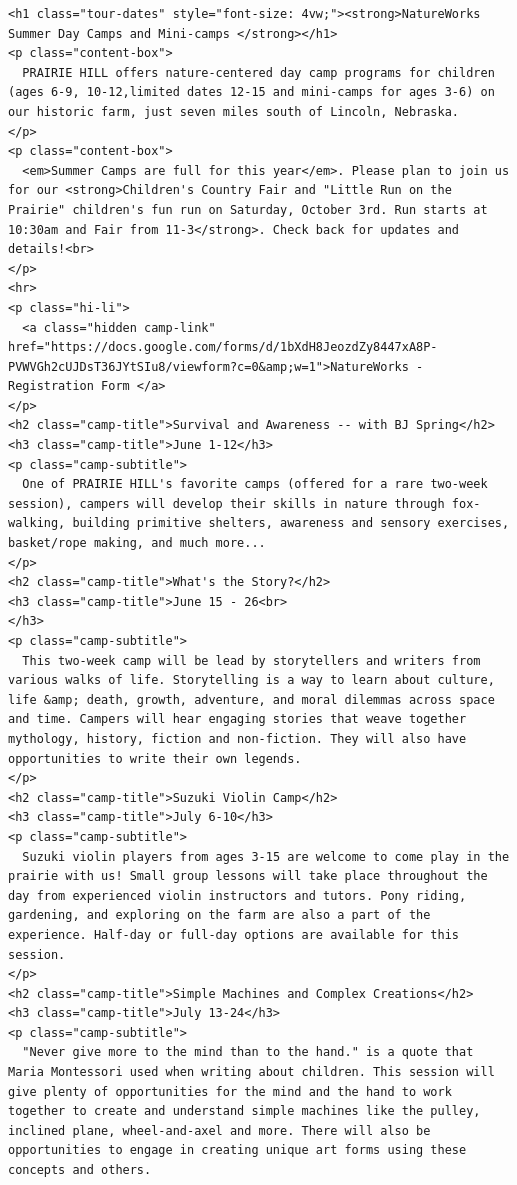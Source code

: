\documentclass[11pt]{article}
\begin{document}
\begin{itemize}
\begin{itemize}
\begin{verbatim}
<h1 class="tour-dates" style="font-size: 4vw;"><strong>NatureWorks Summer Day Camps and Mini-camps </strong></h1>
<p class="content-box">
  PRAIRIE HILL offers nature-centered day camp programs for children (ages 6-9, 10-12,limited dates 12-15 and mini-camps for ages 3-6) on our historic farm, just seven miles south of Lincoln, Nebraska.
</p>
<p class="content-box">
  <em>Summer Camps are full for this year</em>. Please plan to join us for our <strong>Children's Country Fair and "Little Run on the Prairie" children's fun run on Saturday, October 3rd. Run starts at 10:30am and Fair from 11-3</strong>. Check back for updates and details!<br>
</p>
<hr>
<p class="hi-li">
  <a class="hidden camp-link" href="https://docs.google.com/forms/d/1bXdH8JeozdZy8447xA8P-PVWVGh2cUJDsT36JYtSIu8/viewform?c=0&amp;w=1">NatureWorks - Registration Form </a>
</p>
<h2 class="camp-title">Survival and Awareness -- with BJ Spring</h2>
<h3 class="camp-title">June 1-12</h3>
<p class="camp-subtitle">
  One of PRAIRIE HILL's favorite camps (offered for a rare two-week session), campers will develop their skills in nature through fox-walking, building primitive shelters, awareness and sensory exercises, basket/rope making, and much more...
</p>
<h2 class="camp-title">What's the Story?</h2>
<h3 class="camp-title">June 15 - 26<br>
</h3>
<p class="camp-subtitle">
  This two-week camp will be lead by storytellers and writers from various walks of life. Storytelling is a way to learn about culture, life &amp; death, growth, adventure, and moral dilemmas across space and time. Campers will hear engaging stories that weave together mythology, history, fiction and non-fiction. They will also have opportunities to write their own legends.
</p>
<h2 class="camp-title">Suzuki Violin Camp</h2>
<h3 class="camp-title">July 6-10</h3>
<p class="camp-subtitle">
  Suzuki violin players from ages 3-15 are welcome to come play in the prairie with us! Small group lessons will take place throughout the day from experienced violin instructors and tutors. Pony riding, gardening, and exploring on the farm are also a part of the experience. Half-day or full-day options are available for this session.
</p>
<h2 class="camp-title">Simple Machines and Complex Creations</h2>
<h3 class="camp-title">July 13-24</h3>
<p class="camp-subtitle">
  "Never give more to the mind than to the hand." is a quote that Maria Montessori used when writing about children. This session will give plenty of opportunities for the mind and the hand to work together to create and understand simple machines like the pulley, inclined plane, wheel-and-axel and more. There will also be opportunities to engage in creating unique art forms using these concepts and others. 

\end{verbatim}
\end{itemize}
\end{itemize}
\end{document}
